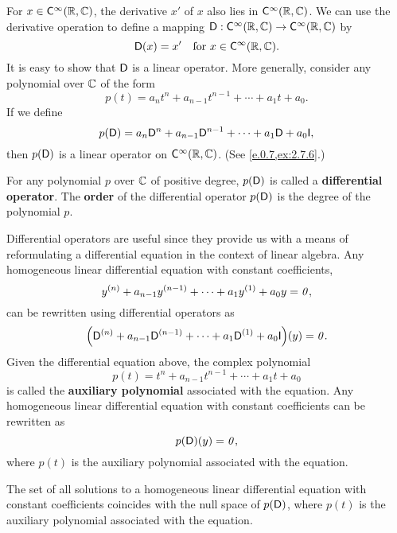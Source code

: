\begin{defn}\label{2.7.5}
  For \(x \in \cfs[\infty](\R, \C)\), the derivative \(x'\) of \(x\) also lies in \(\cfs[\infty](\R, \C)\).
  We can use the derivative operation to define a mapping \(\Dop : \cfs[\infty](\R, \C) \to \cfs[\infty](\R, \C)\) by
  \[
    \Dop(x) = x' \quad \text{for } x \in \cfs[\infty](\R, \C).
  \]
  It is easy to show that \(\mathsf{D}\) is a linear operator.
  More generally, consider any polynomial over \(\mathbb{C}\) of the form
  \[
    p(t) = a_n t^n + a_{n - 1} t^{n - 1} + \cdots + a_1 t + a_0.
  \]
  If we define
  \[
    p(\Dop) = a_n \Dop^n + a_{n - 1} \Dop^{n - 1} + \cdots + a_1 \Dop + a_0 \IT,
  \]
  then \(p(\mathsf{D})\) is a linear operator on \(\cfs[\infty](\R, \C)\).
  (See \cref{e.0.7,ex:2.7.6}.)

  For any polynomial \(p\) over \(\mathbb{C}\) of positive degree, \(p(\mathsf{D})\) is called a \textbf{differential operator}.
  The \textbf{order} of the differential operator \(p(\mathsf{D})\) is the degree of the polynomial \(p\).

  Differential operators are useful since they provide us with a means of reformulating a differential equation in the context of linear algebra.
  Any homogeneous linear differential equation with constant coefficients,
  \[
    y^{(n)} + a_{n - 1} y^{(n - 1)} + \cdots + a_1 y^{(1)} + a_0 y = \mathit{0},
  \]
  can be rewritten using differential operators as
  \[
    \pa{\Dop^{(n)} + a_{n - 1} \Dop^{(n - 1)} + \cdots + a_1 \Dop^{(1)} + a_0 \IT}(y) = \zv.
  \]
  Given the differential equation above, the complex polynomial
  \[
    p(t) = t^n + a_{n - 1} t^{n - 1} + \cdots + a_1 t + a_0
  \]
  is called the \textbf{auxiliary polynomial} associated with the equation.
  Any homogeneous linear differential equation with constant coefficients can be rewritten as
  \[
    p(\mathsf{D})(y) = \mathit{0},
  \]
  where \(p(t)\) is the auxiliary polynomial associated with the equation.
\end{defn}

\begin{thm}\label{2.28}
  The set of all solutions to a homogeneous linear differential equation with constant coefficients coincides with the null space of \(p(\mathsf{D})\), where \(p(t)\) is the auxiliary polynomial associated with the equation.
\end{thm}

